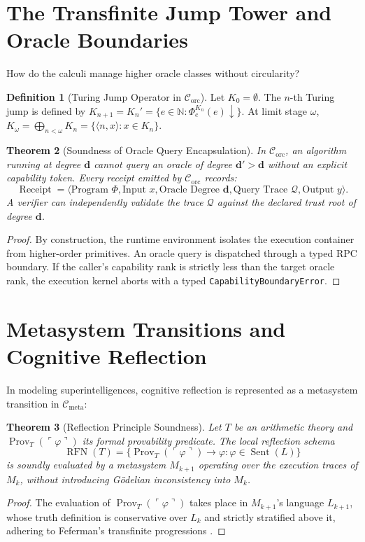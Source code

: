 \documentclass[11pt]{article}
\newtheorem{theorem}{Theorem}[section]
\theoremstyle{definition}
\newtheorem{definition}[theorem]{Definition}
\newcommand{\N}{\mathbb N}
\newcommand{\code}[1]{\ulcorner #1\urcorner}
\begin{document}
\section{The Transfinite Jump Tower and Oracle Boundaries}
How do the calculi manage higher oracle classes without circularity?

\begin{definition}[Turing Jump Operator in $\mathcal{C}_{\mathrm{orc}}$]
Let $K_0 = \emptyset$. The $n$-th Turing jump is defined by $K_{n+1} = K_n' = \{e \in \N : \Phi_e^{K_n}(e)\downarrow\}$. At limit stage $\omega$, $K_\omega = \bigoplus_{n<\omega} K_n = \{\langle n, x \rangle : x \in K_n\}$.
\end{definition}

\begin{theorem}[Soundness of Oracle Query Encapsulation]
In $\mathcal{C}_{\mathrm{orc}}$, an algorithm running at degree $\mathbf{d}$ cannot query an oracle of degree $\mathbf{d}' > \mathbf{d}$ without an explicit capability token. Every receipt emitted by $\mathcal{C}_{\mathrm{orc}}$ records:
\begin{equation}
\operatorname{Receipt} = \langle \text{Program } \Phi, \text{Input } x, \text{Oracle Degree } \mathbf{d}, \text{Query Trace } \mathcal{Q}, \text{Output } y \rangle.
\end{equation}
A verifier can independently validate the trace $\mathcal{Q}$ against the declared trust root of degree $\mathbf{d}$.
\end{theorem}
\begin{proof}
By construction, the runtime environment isolates the execution container from higher-order primitives. An oracle query is dispatched through a typed RPC boundary. If the caller's capability rank is strictly less than the target oracle rank, the execution kernel aborts with a typed \texttt{CapabilityBoundaryError}.
\end{proof}

\section{Metasystem Transitions and Cognitive Reflection}
In modeling superintelligences, cognitive reflection is represented as a metasystem transition in $\mathcal{C}_{\mathrm{meta}}$:

\begin{theorem}[Reflection Principle Soundness]
Let $T$ be an arithmetic theory and $\operatorname{Prov}_T(\code{\varphi})$ its formal provability predicate. The local reflection schema
\[
\operatorname{RFN}(T) = \{\operatorname{Prov}_T(\code{\varphi}) \to \varphi : \varphi \in \operatorname{Sent}(L)\}
\]
is soundly evaluated by a metasystem $M_{k+1}$ operating over the execution traces of $M_k$, without introducing Gödelian inconsistency into $M_k$.
\end{theorem}
\begin{proof}
The evaluation of $\operatorname{Prov}_T(\code{\varphi})$ takes place in $M_{k+1}$'s language $L_{k+1}$, whose truth definition is conservative over $L_k$ and strictly stratified above it, adhering to Feferman's transfinite progressions \cite{feferman}.
\end{proof}
\end{document}
